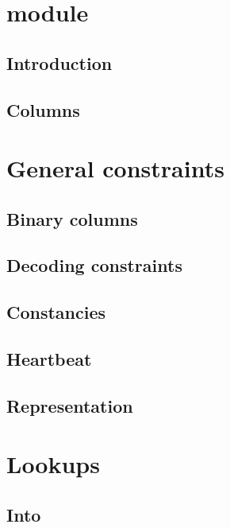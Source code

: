 
\section{\blkMdxMod{} module}
\subsection{Introduction}                      \label{blake + modexp: intro}                        
\subsection{Columns}                           \label{blake + modexp: columns}                      

\section{General constraints}
\subsection{Binary columns}                    \label{blake + modexp: binary}                       
\subsection{Decoding constraints}              \label{blake + modexp: decoding}                     
\subsection{Constancies}                       \label{blake + modexp: constancies}                  
\subsection{Heartbeat}                         \label{blake + modexp: heartbeat}                    
\subsection{Representation}                    \label{blake + modexp: representation}               

\section{Lookups}
\subsection{Into \wcpMod{}}                    \label{blake + modexp: lookups: into wcp}            
                                                                                                    

